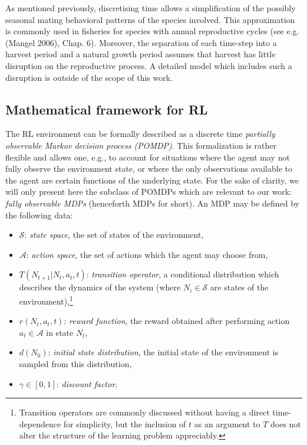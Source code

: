 \documentclass{article}
\begin{document}
As mentioned previously, discretising time allows a simplification of
the possibly seasonal mating behavioral patterns of the species
involved. This approximation is commonly used in fisheries for species
with annual reproductive cycles (see e.g. (Mangel 2006), Chap. 6).
Moreover, the separation of each time-step into a harvest period and a
natural growth period assumes that harvest has little disruption on the
reproductive process. A detailed model which includes such a disruption
is outside of the scope of this work.

\hypertarget{mathematical-framework-for-rl}{%
\subsection{Mathematical framework for
RL}\label{mathematical-framework-for-rl}}

The RL environment can be formally described as a discrete time
\emph{partially observable Markov decision process (POMDP)}. This
formalization is rather flexible and allows one, e.g., to account for
situations where the agent may not fully observe the environment state,
or where the only observations available to the agent are certain
functions of the underlying state. For the sake of clarity, we will only
present here the subclass of POMDPs which are relevant to our work:
\emph{fully observable MDPs} (henceforth MDPs for short). An MDP may be
defined by the following data:

\begin{itemize}
\item
  \(\mathcal{S}\): \emph{state space}, the set of states of the
  environment,
\item
  \(\mathcal{A}\): \emph{action space}, the set of actions which the
  agent may choose from,
\item
  \(T(N_{t+1}|N_t, a_t, t)\): \emph{transition operator}, a conditional
  distribution which describes the dynamics of the system (where
  \(N_i\in\mathcal{S}\) are states of the environment),\footnote{
  Transition operators are commonly discussed without having a direct time-dependence for simplicity, but the inclusion of $t$ as an argument to $T$ does not alter the structure of the learning problem appreciably.
  }
\item
  \(r(N_t, a_t, t)\): \emph{reward function}, the reward obtained after
  performing action \(a_t\in\mathcal{A}\) in state \(N_t\),
\item
  \(d(N_0)\): \emph{initial state distribution}, the initial state of
  the environment is sampled from this distribution,
\item
  \(\gamma\in[0,1]\): \emph{discount factor}.
\end{itemize}
\end{document}
